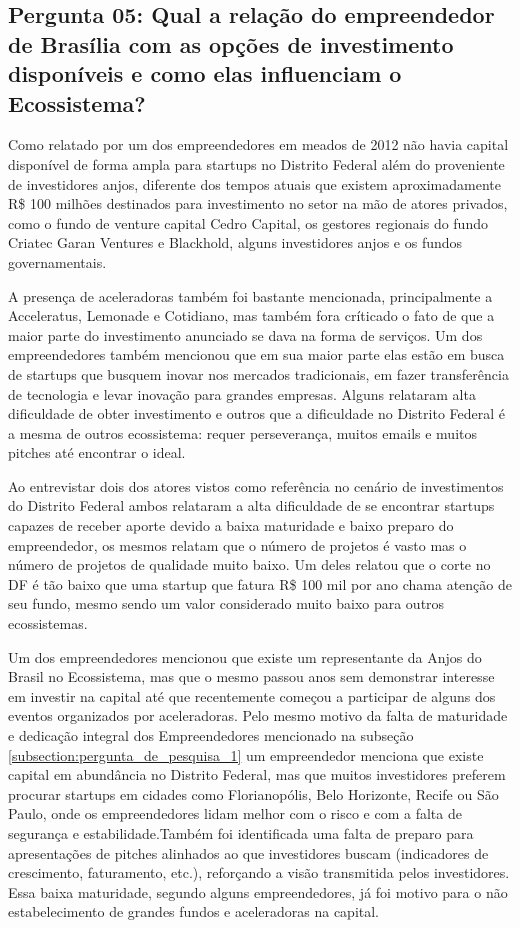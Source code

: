 \subsection*{Pergunta 05: Qual a relação do empreendedor de Brasília com as opções de investimento disponíveis e como elas influenciam o Ecossistema?}
\label{subsection:pergunta_de_pesquisa_5}

Como relatado por um dos empreendedores em meados de 2012 não havia capital disponível de forma ampla para startups no Distrito Federal além do proveniente de investidores anjos, diferente dos tempos atuais que existem aproximadamente R\$ 100 milhões destinados para investimento no setor na mão de atores privados, como o fundo de venture capital Cedro Capital, os gestores regionais do fundo Criatec Garan Ventures e Blackhold, alguns investidores anjos e os fundos governamentais. 

A presença de aceleradoras também foi bastante mencionada, principalmente a Acceleratus, Lemonade e Cotidiano, mas também fora críticado o fato de que a maior parte do investimento anunciado se dava na forma de serviços. Um dos empreendedores também mencionou que em sua maior parte elas estão em busca de startups que busquem inovar nos mercados tradicionais, em fazer transferência de tecnologia e levar inovação para grandes empresas. Alguns relataram alta dificuldade de obter investimento e outros que a dificuldade no Distrito Federal é a mesma de outros ecossistema: requer perseverança, muitos emails e muitos pitches até encontrar o ideal.

Ao entrevistar dois dos atores vistos como referência no cenário de investimentos do Distrito Federal ambos relataram a alta dificuldade de se encontrar startups capazes de receber aporte devido a baixa maturidade e baixo preparo do empreendedor, os mesmos relatam que o número de projetos é vasto mas o número de projetos de qualidade muito baixo. Um deles relatou que o corte no DF é tão baixo que uma startup que fatura R\$ 100 mil por ano chama atenção de seu fundo, mesmo sendo um valor considerado muito baixo para outros ecossistemas. 

Um dos empreendedores mencionou que existe um representante da Anjos do Brasil no Ecossistema, mas que o mesmo passou anos sem demonstrar interesse em investir na capital até que recentemente começou a participar de alguns dos eventos organizados por aceleradoras. Pelo mesmo motivo da falta de maturidade e dedicação integral dos Empreendedores mencionado na subseção \ref{subsection:pergunta_de_pesquisa_1} um empreendedor menciona que existe capital em abundância no Distrito Federal, mas que muitos investidores preferem procurar startups em cidades como Florianopólis, Belo Horizonte, Recife ou São Paulo, onde os empreendedores lidam melhor com o risco e com a falta de segurança e estabilidade.Também foi identificada uma falta de preparo para apresentações de pitches alinhados ao que investidores buscam (indicadores de crescimento, faturamento, etc.), reforçando a visão transmitida pelos investidores. Essa baixa maturidade, segundo alguns empreendedores, já foi motivo para o não estabelecimento de grandes fundos e aceleradoras na capital.

